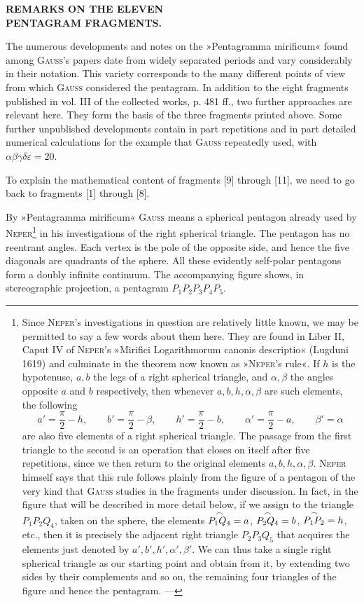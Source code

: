 \clearpage{}
\begin{center}\bfseries REMARKS ON THE ELEVEN\\PENTAGRAM FRAGMENTS.\end{center}

The numerous developments and notes on the »Pentagramma mirificum« found among
\textsc{Gauss}'s papers date from widely separated periods and vary considerably in their
notation. This variety corresponds to the many different points of view from which
\textsc{Gauss} considered the pentagram. In addition to the eight fragments published in
vol. III of the collected works, p. 481 ff., two further approaches are relevant here.
They form the basis of the three fragments printed above. Some further unpublished
developments contain in part
repetitions and in part detailed numerical calculations for the example that \textsc{Gauss}
repeatedly used, with $\alpha\beta\gamma\delta\varepsilon = 20$.

To explain the mathematical content of fragments [9] through [11], we need to go back
to fragments [1] through [8].

By »Pentagramma mirificum« \textsc{Gauss} means a spherical pentagon already used by \textsc{Neper}\footnote{Since
\textsc{Neper}'s investigations in question are relatively little known, we may be permitted
to say a few words about them here. They are found in Liber II,
Caput IV
of \textsc{Neper}'s »Mirifici Logarithmorum canonis descriptio« (Lugduni 1619) and
culminate in the theorem now known as »\textsc{Neper}'s rule«. If $h$ is the hypotenuse,
$a, b$ the legs of a right spherical triangle, and $\alpha, \beta$ the angles opposite
$a$ and $b$ respectively, then whenever $a, b, h, \alpha, \beta$ are such elements, the following
\[
a' = \frac{\pi}{2}-h, \qquad b' = \frac{\pi}{2}-\beta, \qquad h' = \frac{\pi}{2}-b, \qquad
\alpha' = \frac{\pi}{2}-a, \qquad \beta' = \alpha
\]
are also five elements of a right spherical triangle. The passage
from the first triangle to the second is an operation that closes on itself after five repetitions,
since we then return to the original elements
$a, b, h, \alpha, \beta$. \textsc{Neper} himself says that this rule follows plainly
from the figure of a pentagon of the very kind that \textsc{Gauss} studies in the fragments
under discussion. In fact, in the figure that will be described in more detail below, if we assign
to the triangle $P_1P_2Q_4$, taken on the sphere, the elements
$\overset{\frown}{P_1Q_4}=a$, $\overset{\frown}{P_2Q_4}=b$, $\overset{\frown}{P_1P_2}=h$, etc., then it is precisely the
adjacent right triangle $P_2P_3Q_5$ that acquires the elements just denoted by $a', b', h', \alpha',
\beta'$. We can thus take a single
right spherical triangle as our starting point and obtain from it, by
extending two sides by their complements and so on, the remaining four triangles of the
figure and hence the pentagram. ---} in his investigations of the right spherical triangle.
The pentagon has no reentrant angles. Each vertex is the pole of the opposite side,
and hence the five diagonals are quadrants of the sphere. All these
evidently self-polar pentagons form a doubly infinite continuum. The
accompanying figure shows, in stereographic projection, a pentagram
$P_1P_2P_3P_4P_5$.

